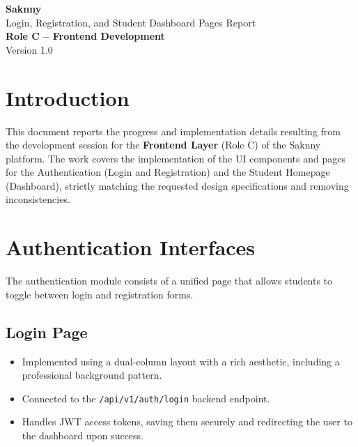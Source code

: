 \documentclass[12pt,a4paper]{article}
\begin{document}
\begin{titlepage}
    \centering
    \vspace*{3cm}

    {\Huge\bfseries\textcolor{saknnyprimary}{Saknny}}\\[0.5cm]
    {\Large\textcolor{saknnyaccent}{Login, Registration, and Student Dashboard Pages Report}}\\[1.5cm]

    {\large\textbf{Role C -- Frontend Development}}\\[0.5cm]

    \vfill
    {\small Version 1.0}
\end{titlepage}

\tableofcontents
\newpage

\section{Introduction}
This document reports the progress and implementation details resulting from the development session for the \textbf{Frontend Layer} (Role C) of the Saknny platform. The work covers the implementation of the UI components and pages for the Authentication (Login and Registration) and the Student Homepage (Dashboard), strictly matching the requested design specifications and removing inconsistencies.

\section{Authentication Interfaces}
The authentication module consists of a unified page that allows students to toggle between login and registration forms.

\subsection{Login Page}
\begin{itemize}[noitemsep]
    \item Implemented using a dual-column layout with a rich aesthetic, including a professional background pattern.
    \item Connected to the \texttt{/api/v1/auth/login} backend endpoint.
    \item Handles JWT access tokens, saving them securely and redirecting the user to the dashboard upon success.
\end{itemize}
\end{document}
